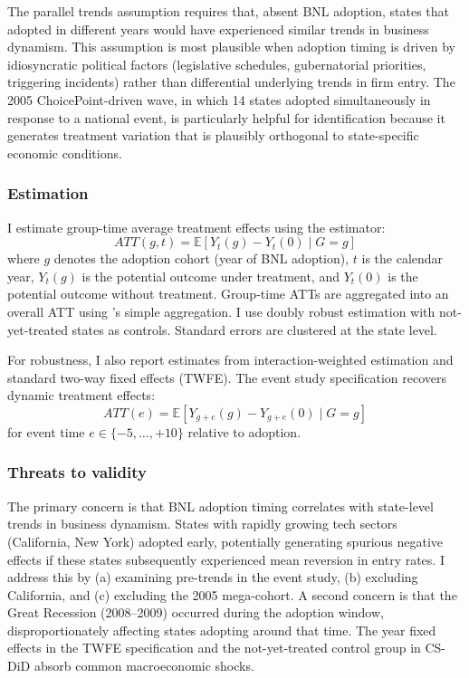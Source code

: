 \documentclass[12pt]{article}
\newcommand{\E}{\mathbb{E}}
\begin{document}
The parallel trends assumption requires that, absent BNL adoption, states that adopted in different years would have experienced similar trends in business dynamism. This assumption is most plausible when adoption timing is driven by idiosyncratic political factors (legislative schedules, gubernatorial priorities, triggering incidents) rather than differential underlying trends in firm entry. The 2005 ChoicePoint-driven wave, in which 14 states adopted simultaneously in response to a national event, is particularly helpful for identification because it generates treatment variation that is plausibly orthogonal to state-specific economic conditions.

\subsubsection*{Estimation} I estimate group-time average treatment effects using the \citet{callaway2021difference} estimator:
\begin{equation}
ATT(g,t) = \E[Y_{t}(g) - Y_{t}(0) \mid G = g]
\end{equation}
where $g$ denotes the adoption cohort (year of BNL adoption), $t$ is the calendar year, $Y_t(g)$ is the potential outcome under treatment, and $Y_t(0)$ is the potential outcome without treatment. Group-time ATTs are aggregated into an overall ATT using \citeauthor{callaway2021difference}'s simple aggregation. I use doubly robust estimation with not-yet-treated states as controls. Standard errors are clustered at the state level.

For robustness, I also report estimates from \citet{sun2021estimating} interaction-weighted estimation and standard two-way fixed effects (TWFE). The event study specification recovers dynamic treatment effects:
\begin{equation}
ATT(e) = \E[Y_{g+e}(g) - Y_{g+e}(0) \mid G = g]
\end{equation}
for event time $e \in \{-5, \ldots, +10\}$ relative to adoption.

\subsubsection*{Threats to validity} The primary concern is that BNL adoption timing correlates with state-level trends in business dynamism. States with rapidly growing tech sectors (California, New York) adopted early, potentially generating spurious negative effects if these states subsequently experienced mean reversion in entry rates. I address this by (a) examining pre-trends in the event study, (b) excluding California, and (c) excluding the 2005 mega-cohort. A second concern is that the Great Recession (2008--2009) occurred during the adoption window, disproportionately affecting states adopting around that time. The year fixed effects in the TWFE specification and the not-yet-treated control group in CS-DiD absorb common macroeconomic shocks.
\end{document}
